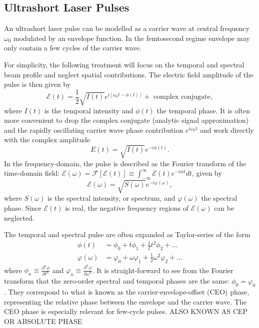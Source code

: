 \documentclass[a4paper]{jpconf}
\begin{document}
\subsection{Ultrashort Laser Pulses}
An ultrashort laser pulse can be modelled as a carrier wave at central frequency $\omega_0$ modulated by an envelope function. In the femtosecond regime envelope may only contain a few cycles of the carrier wave. \par 
For simplicity, the following treatment will focus on the temporal and spectral beam profile and neglect spatial contributions. The electric field amplitude of the pulse is then given by 
\begin{equation}
\mathcal{E}(t)= \frac{1}{2} \sqrt{I(t)} e^{i [\omega_0 t - \phi(t)]} + \text{ complex conjugate},
\end{equation}
where $I(t)$ is the temporal intensity and $\phi(t)$ the temporal phase. It is often more convenient to drop the complex conjugate (analytic signal approximation) and the rapidly oscillating carrier wave phase contribution $e^{i \omega_0 t}$ and work directly with the complex amplitude
\begin{equation}
E(t) = \sqrt{I(t)}e^{- i \phi(t)}.
\end{equation}
In the frequency-domain, the pulse is described as the Fourier transform of the time-domain field: $\mathcal{E}(\omega) = \mathcal{F}[\mathcal{E}(t)] \equiv \int_{-\infty}^\infty \mathcal{E}(t) e^{-iwt} dt$, given by 
\begin{equation}
\mathcal{E}(\omega) = \sqrt{S(\omega)} e^{-i \varphi(\omega)},
\end{equation}
where $S(\omega)$ is the spectral intensity, or spectrum, and $\varphi(\omega)$ the spectral phase. Since $\mathcal{E}(t)$ is real, the negative frequency regions of $\mathcal{E}(\omega)$ can be neglected. \par 
The temporal and spectral pulse are often expanded as Taylor-series of the form 
\begin{align}
\phi(t) &= \phi_0 + t \phi_1 + \frac{1}{2} t^2 \phi_2 + ...  \\
\varphi(\omega) &= \varphi_0 + \omega \varphi_1 + \frac{1}{2} \omega^2 \varphi_2 + ...
\end{align}
where $\phi_n \equiv \frac{\partial^n \phi}{\partial t^n}$ and $\varphi_n \equiv \frac{\partial^n \varphi}{\partial \omega^n}$. It is straight-forward to see from the Fourier transform that the zero-order spectral and temporal phases are the same: $\phi_0 = \varphi_0$. They correspond to what is known as the carrier-envelope-offset (CEO) phase, representing the relative phase between the envelope and the carrier wave. The CEO phase is especially relevant for few-cycle pulses. ALSO KNOWN AS CEP OR ABSOLUTE PHASE \par 
\end{document}
